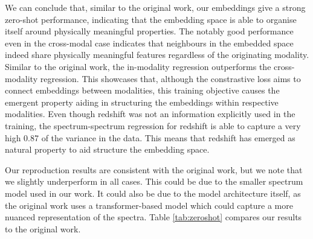 \documentclass[draft, a4paper,12pt]{article}
\begin{document}
We can conclude that, similar to the original work, our embeddings give a strong zero-shot performance, indicating that the embedding space is able to organise itself around physically meaningful properties. The notably good performance even in the cross-modal case indicates that neighbours in the embedded space indeed share physically meaningful features regardless of the originating modality. Similar to the original work, the in-modality regression outperforms the cross-modality regression. This showcases that, although the constrastive loss aims to connect embeddings between modalities, this training objective causes the emergent property aiding in structuring the embeddings within respective modalities. Even though redshift was not an information explicitly used in the training, the spectrum-spectrum regression for redshift is able to capture a very high 0.87 of the variance in the data. This means that redshift has emerged as natural property to aid structure the embedding space.

Our reproduction results are consistent with the original work, but we note that we slightly underperform in all cases. This could be due to the smaller spectrum model used in our work. It could also be due to the model architecture itself, as the original work uses a transformer-based model which could capture a more nuanced representation of the spectra. Table \ref{tab:zeroshot} compares our results to the original work.
\end{document}
